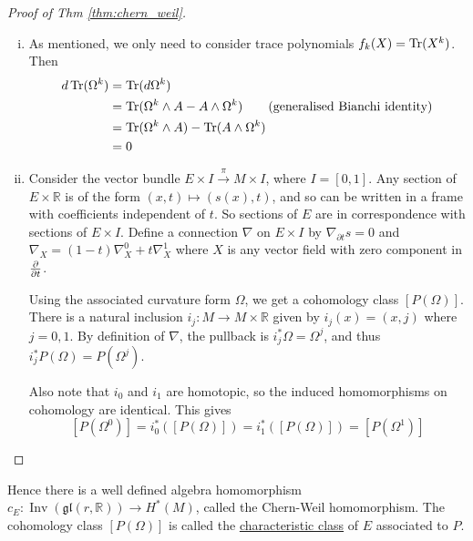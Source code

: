 \begin{proof}[Proof of Thm \ref{thm:chern_weil}]
	\begin{enumerate}[(i)]
	    \item As mentioned, we only need to consider trace polynomials
			$f_k(X)=\operatorname{Tr}(X^k)$. Then 
		\begin{align*}
			d \operatorname{Tr}(\Omega^{k})
			&= \operatorname{Tr} (d \Omega^{k}) \\
			&= \operatorname{Tr} (\Omega^{k} \wedge A - A \wedge \Omega^{k}) \tag{generalised
			Bianchi identity} \\
			&= \operatorname{Tr} (\Omega^{k} \wedge A) - \operatorname{Tr}(A \wedge \Omega^{k}) \\
			&= 0 
		\end{align*}
	\item \cite[Prop 5.28]{morita}	
		\begin{comment}
		Again, we only need to consider $P = \Tr(X^k) 
		\in \operatorname{Inv}(\mathfrak{gl}(r,\mathbb{R}))$. 
		To show that the cohomology class does not depend on the choice of
		connection, we need to show that for two connections $\nabla^0$ and
		$\nabla^1$,$P(\Omega_0) - P(\Omega_1) \in \Im(d)$. We will construct a
		$(2k-1)$-form whose exterior derivative is the above.
		\end{comment}
	Consider the vector bundle $E\times I
	\xrightarrow{\pi} M\times I$, where $I = [0,1]$. Any section of  $E\times
	\mathbb{R}$ is of the form $(x,t) \mapsto (s(x),t)$, and so can be written
	in a frame with coefficients independent of $t$. So sections of $E$ are in
	correspondence with sections of  $E\times I$. Define a connection $\nabla$ 
	on $E\times I$ by $\nabla_{\partial t} s = 0$ and $\nabla_X =
	(1-t)\nabla^0_X+t\nabla^1_X$ where $X$ is any vector field with zero
	component in  $\pdv{}{t}$.

	Using the associated curvature form $\Omega$, we get a cohomology class
	$[P(\Omega)]$. There is a natural inclusion  $i_j : M \to M \times
	\mathbb{R}$ given by $i_j(x)=(x,j)$ where $j=0,1$. By definition of
	$\nabla$, the pullback is $i^*_j \Omega = \Omega^j$, and thus $i^*_j
	P(\Omega) = P(\Omega^j)$.
	
	Also note that $i_0$ and $i_1$ are homotopic, so the induced homomorphisms on
	cohomology are identical. This gives 
	\[
		[P(\Omega^0)] = i_0^*([P(\Omega)]) = i_1^*([P(\Omega)])=[P(\Omega^1)]
	\] 
	\end{enumerate}
\end{proof}

Hence there is a well defined algebra homomorphism $c_E :
\operatorname{Inv}(\mathfrak{gl}(r,\mathbb{R}))\to H^{*}(M)$, called the
Chern-Weil homomorphism.
The cohomology class $[P(\Omega)]$ is called the \underline{characteristic
class} of $E$ associated to  $P$. 

